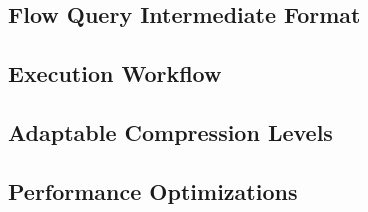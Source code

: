 \subsection{Flow Query Intermediate Format}

\label{subsec:intermediate-format}

\subsection{Execution Workflow}

\label{subsec:execution-workflow}

\subsection{Adaptable Compression Levels}

\label{subsec:adaptable-compression-levels}

\subsection{Performance Optimizations}

\label{subsec:performance-optimizations}
